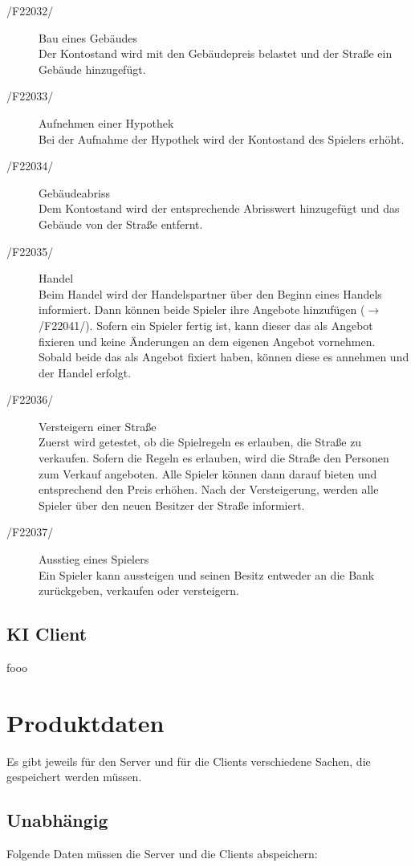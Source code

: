 \documentclass[a4paper,10pt]{article}
\begin{document}
\begin{description}
\item[/F22032/] Bau eines Gebäudes \\
Der Kontostand wird mit den Gebäudepreis belastet und der Straße ein Gebäude hinzugefügt.
\item[/F22033/] Aufnehmen einer Hypothek \\
Bei der Aufnahme der Hypothek wird der Kontostand des Spielers erhöht.
\item[/F22034/] Gebäudeabriss \\
Dem Kontostand wird der entsprechende Abrisswert hinzugefügt und das Gebäude von der Straße entfernt.
\item[/F22035/] Handel \\
Beim Handel wird der Handelspartner über den Beginn eines Handels informiert. Dann können beide Spieler ihre Angebote hinzufügen ($\rightarrow$ /F22041/). Sofern ein Spieler fertig ist, kann dieser das als Angebot fixieren und keine Änderungen an dem eigenen Angebot vornehmen. Sobald beide das als Angebot fixiert haben, können diese es annehmen und der Handel erfolgt.
\item[/F22036/] Versteigern einer Straße \\
Zuerst wird getestet, ob die Spielregeln es erlauben, die Straße zu verkaufen. Sofern die Regeln es erlauben, wird die Straße den Personen zum Verkauf angeboten. Alle Spieler können dann darauf bieten und entsprechend den Preis erhöhen. Nach der Versteigerung, werden alle Spieler über den neuen Besitzer der Straße informiert.
\item[/F22037/] Ausstieg eines Spielers \\
Ein Spieler kann aussteigen und seinen Besitz entweder an die Bank zurückgeben, verkaufen oder versteigern.
\end{description}
\subsection{KI Client}
\begin{description}
\item fooo
\end{description}
\section{Produktdaten}
Es gibt jeweils für den Server und für die Clients verschiedene Sachen, die gespeichert werden müssen.
\subsection{Unabhängig}
Folgende Daten müssen die Server und die Clients abspeichern:
\end{document}
